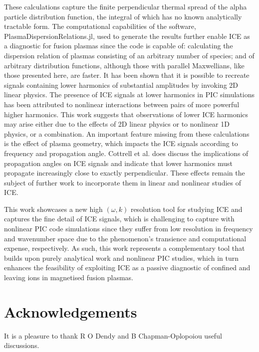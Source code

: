 \documentclass[12pt]{iopart}
\begin{document}
These calculations capture the finite perpendicular thermal spread of the alpha particle distribution function, the integral of which has no known analytically tractable form. The computational capabilities of the software, PlasmaDispersionRelations.jl, used to generate the results further enable ICE as a diagnostic for fusion plasmas since the code is capable of: calculating the dispersion relation of plasmas consisting of an arbitrary number of species; and of arbitrary distribution functions, although those with parallel Maxwellians, like those presented here, are faster. It has been shown that it is possible to recreate signals containing lower harmonics of substantial amplitudes by invoking 2D linear physics. The presence of ICE signals at lower harmonics in PIC simulations has been attributed to nonlinear interactions between pairs of more powerful higher harmonics\cite{Carbajal2014}. This work suggests that observations of lower ICE harmonics may arise either due to the effects of 2D linear physics or to nonlinear 1D physics\cite{Chapman2018}, or a combination. An important feature missing from these calculations is the effect of plasma geometry, which impacts the ICE signals according to frequency and propagation angle. Cottrell et al. \cite{Cottrell1993} does discuss the implications of propagation angles on ICE signals and indicate that lower harmonics must propagate increasingly close to exactly perpendicular. These effects remain the subject of further work to incorporate them in linear and nonlinear studies of ICE.

This work showcases a new high $(\omega,k)$ resolution tool for studying ICE and captures the fine detail of ICE signals, which is challenging to capture with nonlinear PIC code simulations since they suffer from low resolution in frequency and wavenumber space due to the phenomenon's transience and computational expense, respectively. As such, this work represents a complementary tool that builds upon purely analytical work and nonlinear PIC studies, which in turn enhances the feasibility of exploiting ICE as a passive diagnostic of confined and leaving ions in magnetised fusion plasmas.

\section{Acknowledgements}

It is a pleasure to thank R O Dendy and B Chapman-Oplopoiou useful discussions.

\appendix
\end{document}
